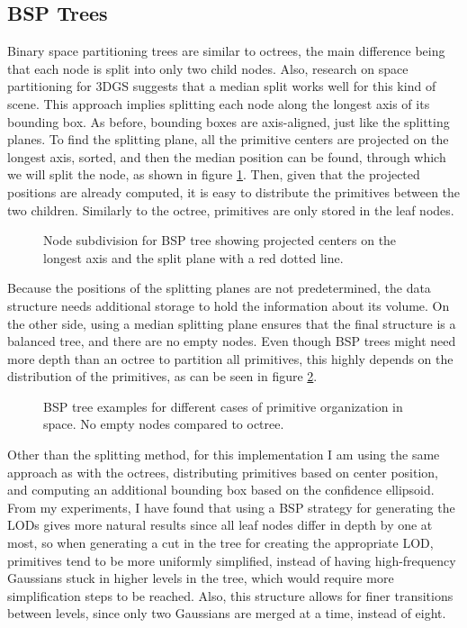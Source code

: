 \subsection{BSP Trees}
Binary space partitioning trees are similar to octrees, the main difference being that each node is split into only two child nodes. Also, research on space partitioning for 3DGS suggests that a median split works well for this kind of scene. This approach implies splitting each node along the longest axis of its bounding box. As before, bounding boxes are axis-aligned, just like the splitting planes. To find the splitting plane, all the primitive centers are projected on the longest axis, sorted, and then the median position can be found, through which we will split the node, as shown in figure \ref{fig:bsptree_split}. Then, given that the projected positions are already computed, it is easy to distribute the primitives between the two children. Similarly to the octree, primitives are only stored in the leaf nodes. 

\begin{figure}[H]
    \centering
    
    \caption{Node subdivision for BSP tree showing projected centers on the longest axis and the split plane with a red dotted line.}
    \label{fig:bsptree_split}
\end{figure}

Because the positions of the splitting planes are not predetermined, the data structure needs additional storage to hold the information about its volume. On the other side, using a median splitting plane ensures that the final structure is a balanced tree, and there are no empty nodes. Even though BSP trees might need more depth than an octree to partition all primitives, this highly depends on the distribution of the primitives, as can be seen in figure \ref{fig:bsptree_diff}.

\begin{figure}[H]
    \centering
    
    \caption{BSP tree examples for different cases of primitive organization in space. No empty nodes compared to octree.}
    \label{fig:bsptree_diff}
\end{figure}

Other than the splitting method, for this implementation I am using the same approach as with the octrees, distributing primitives based on center position, and computing an additional bounding box based on the confidence ellipsoid. From my experiments, I have found that using a BSP strategy for generating the LODs gives more natural results since all leaf nodes differ in depth by one at most, so when generating a cut in the tree for creating the appropriate LOD, primitives tend to be more uniformly simplified, instead of having high-frequency Gaussians stuck in higher levels in the tree, which would require more simplification steps to be reached. Also, this structure allows for finer transitions between levels, since only two Gaussians are merged at a time, instead of eight.

